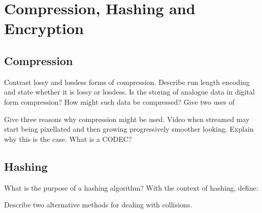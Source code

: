 \section{Compression, Hashing and Encryption}

\begin{questions}
\subsection{Compression}
	\question Contrast lossy and lossless forms of compression.
	\question Describe run length encoding and state whether it is lossy or lossless. 
	\question Is the storing of analogue data in digital form compression? How might such data be compressed? 
	\question Give two uses of
	\question Give three reasons why compression might be used. 
	\question Video when streamed may start being pixellated and then growing progressively smoother looking. Explain why this is the case. 
	\question What is a CODEC?

\subsection{Hashing}   

	\question What is the purpose of a hashing algorithm? 
	\question With the context of hashing, define: 
	\question Describe two alternative methods for dealing with collisions. 


\end{questions}
